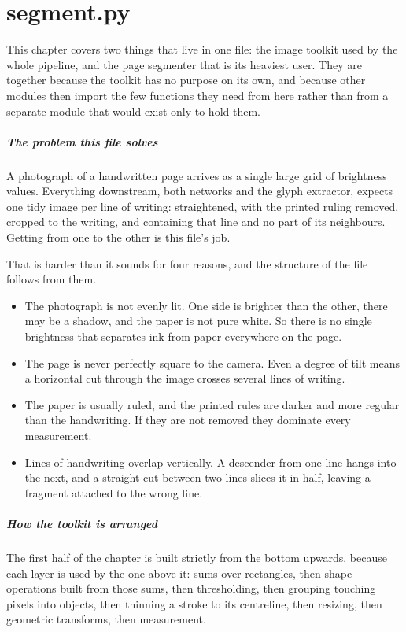
\chapter{segment.py}
This chapter covers two things that live in one file: the image toolkit used by the whole pipeline, and the page segmenter that is its heaviest user. They are together because the toolkit has no purpose on its own, and because other modules then import the few functions they need from here rather than from a separate module that would exist only to hold them.


\paragraph{The problem this file solves}
A photograph of a handwritten page arrives as a single large grid of brightness values. Everything downstream, both networks and the glyph extractor, expects one tidy image per line of writing: straightened, with the printed ruling removed, cropped to the writing, and containing that line and no part of its neighbours. Getting from one to the other is this file's job.

That is harder than it sounds for four reasons, and the structure of the file follows from them.


\begin{itemize}\setlength\itemsep{0pt}
  \item The photograph is not evenly lit. One side is brighter than the other, there may be a shadow, and the paper is not pure white. So there is no single brightness that separates ink from paper everywhere on the page.
  \item The page is never perfectly square to the camera. Even a degree of tilt means a horizontal cut through the image crosses several lines of writing.
  \item The paper is usually ruled, and the printed rules are darker and more regular than the handwriting. If they are not removed they dominate every measurement.
  \item Lines of handwriting overlap vertically. A descender from one line hangs into the next, and a straight cut between two lines slices it in half, leaving a fragment attached to the wrong line.
\end{itemize}

\paragraph{How the toolkit is arranged}
The first half of the chapter is built strictly from the bottom upwards, because each layer is used by the one above it: sums over rectangles, then shape operations built from those sums, then thresholding, then grouping touching pixels into objects, then thinning a stroke to its centreline, then resizing, then geometric transforms, then measurement.


